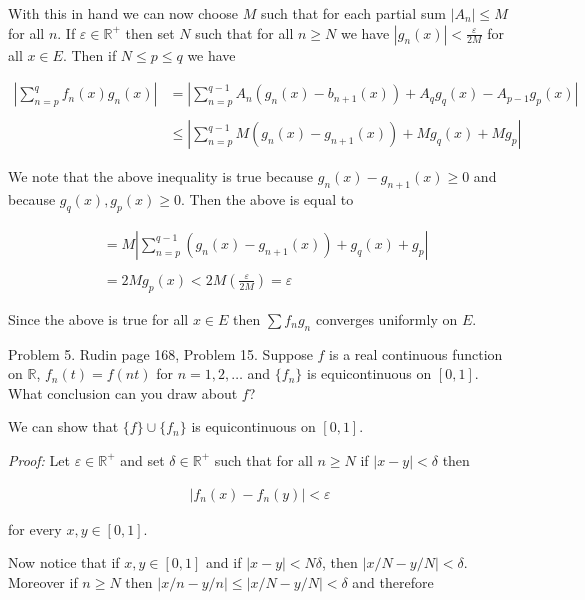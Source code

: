 \documentclass{article}
\begin{document}
  With this in hand we can now choose $M$ such that for each partial sum $|A_n|\leq M$ for all $n$.  If $\varepsilon\in\mathbb R^+$ then set $N$ such that for all $n\geq N$ we have $|g_n(x)|<\frac{\varepsilon}{2M}$ for all $x\in E$.  Then if $N\le p\le q$ we have

  \begin{align*}
    \left|\sum_{n=p}^q f_n(x)g_n(x) \right| &= \left| \sum_{n=p}^{q-1} A_n(g_n(x)-b_{n+1}(x)) + A_qg_q(x)-A_{p-1}g_p(x) \right| \\\\
    &\le \left|\sum_{n=p}^{q-1}M(g_n(x)-g_{n+1}(x))+Mg_q(x)+Mg_p\right| 
  \end{align*}

  We note that the above inequality is true because $g_n(x)-g_{n+1}(x)\geq 0$ and because $g_q(x),g_p(x)\ge 0$.  Then the above is equal to 

  \begin{align*}
    &= M \left|\sum_{n=p}^{q-1}(g_n(x)-g_{n+1}(x))+g_q(x)+g_p\right| \\\\
    &= 2Mg_p(x) <2M\left(\frac{\varepsilon}{2M}\right)=\varepsilon
  \end{align*}

  Since the above is true for all $x\in E$ then $\sum f_ng_n$ converges uniformly on $E$.

\pagebreak
  
  {\Large \color{Sepia} Problem 5. Rudin page 168, Problem 15. Suppose $f$ is a real continuous function on $\mathbb R$, $f_n(t)= f(nt)$ for $n=1,2,\dots$ and $\{f_n\}$ is equicontinuous on $[0,1]$.  What conclusion can you draw about $f$?}

  \vspace{1cm} 

  We can show that $\{f\}\cup \{f_n\}$ is equicontinuous on $[0,1]$.  

  {\it Proof:} Let $\varepsilon\in\mathbb R^+$ and set $\delta\in\mathbb R^+$ such that for all $n\ge N$ if $|x-y|<\delta$ then 

  \begin{align*}
    |f_n(x)-f_n(y)|<\varepsilon
  \end{align*}
  
  for every $x,y\in[0,1]$.  

  Now notice that if $x,y\in [0,1]$ and if $|x-y|<N\delta$, then $|x/N-y/N|<\delta$.  Moreover if $n\ge N$ then $|x/n-y/n|\le |x/N-y/N|<\delta$ and therefore 
\end{document}
